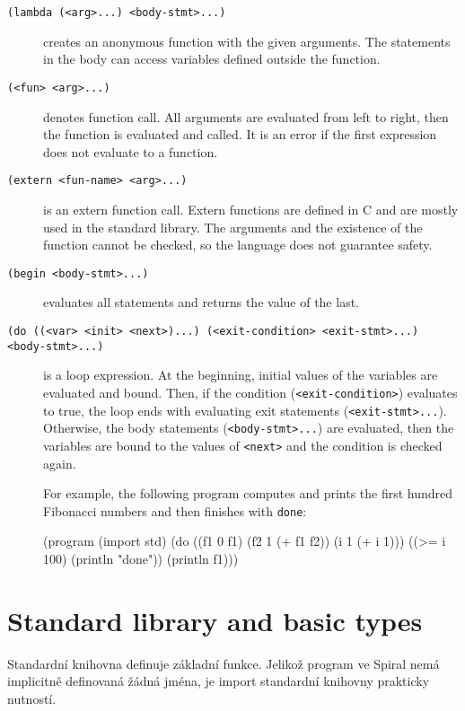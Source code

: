 \begin{description}
  \item[\texttt{(lambda (<arg>...) <body-stmt>...)}] creates an anonymous
    function with the given arguments. The statements in the body can access
    variables defined outside the function.

  \item[\texttt{(<fun> <arg>...)}] denotes function call. All arguments are
    evaluated from left to right, then the function is evaluated and called. It
    is an error if the first expression does not evaluate to a function.

  \item[\texttt{(extern <fun-name> <arg>...)}] is an extern function call.
    Extern functions are defined in C and are mostly used in the standard
    library. The arguments and the existence of the function cannot be checked,
    so the language does not guarantee safety.

  \item[\texttt{(begin <body-stmt>...)}] evaluates all statements and returns
    the value of the last.

  \item[\texttt{(do ((<var> <init> <next>)...) (<exit-condition> <exit-stmt>...)
    <body-stmt>...)}] is a loop expression. At the beginning, initial values of
    the variables are evaluated and bound. Then, if the condition
    (\texttt{<exit-condition>}) evaluates to true, the loop ends with evaluating
    exit statements (\texttt{<exit-stmt>...}). Otherwise, the body statements
    (\texttt{<body-stmt>...}) are evaluated, then the variables are bound to the
    values of \texttt{<next>} and the condition is checked again.

    For example, the following program computes and prints the first hundred
    Fibonacci numbers and then finishes with \texttt{done}:

\begin{spiral}
(program
  (import std)
  (do ((f1 0 f1)
       (f2 1 (+ f1 f2))
       (i  1 (+ i 1)))
    ((>= i 100)
      (println "done"))
    (println f1)))
\end{spiral}
\end{description}

\section{Standard library and basic types}

Standardní knihovna definuje základní funkce. Jelikož program ve Spiral nemá
implicitně definovaná žádná jména, je import standardní knihovny prakticky
nutností.

